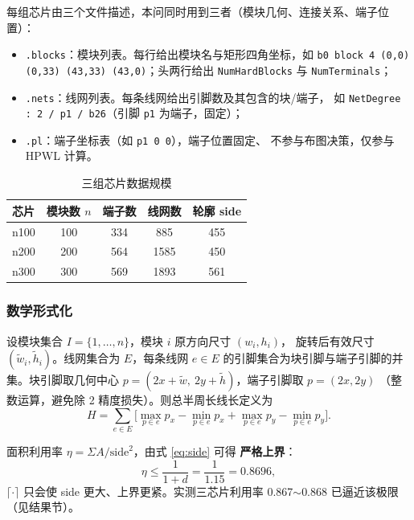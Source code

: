 \documentclass[12pt,a4paper]{article}
\begin{document}
每组芯片由三个文件描述，本问同时用到三者（模块几何、连接关系、端子位置）：

\begin{itemize}
    \item \texttt{.blocks}：模块列表。每行给出模块名与矩形四角坐标，如
    \texttt{b0 block 4 (0,0) (0,33) (43,33) (43,0)}；头两行给出
    \texttt{NumHardBlocks} 与 \texttt{NumTerminals}；
    \item \texttt{.nets}：线网列表。每条线网给出引脚数及其包含的块/端子，
    如 \texttt{NetDegree : 2 / p1 / b26}（引脚 \texttt{p1} 为端子，固定）；
    \item \texttt{.pl}：端子坐标表（如 \texttt{p1 0 0}），端子位置固定、
    不参与布图决策，仅参与 HPWL 计算。
\end{itemize}

\begin{table}[H]
\centering
\caption{三组芯片数据规模}
\begin{tabular}{lcccc}
\toprule
芯片 & 模块数 $n$ & 端子数 & 线网数 & 轮廓 side \\
\midrule
n100 & 100 & 334 & 885 & 455 \\
n200 & 200 & 564 & 1585 & 450 \\
n300 & 300 & 569 & 1893 & 561 \\
\bottomrule
\end{tabular}
\end{table}

\subsubsection*{数学形式化}

设模块集合 $I = \{1, \dots, n\}$，模块 $i$ 原方向尺寸 $(w_i, h_i)$，
旋转后有效尺寸 $(\tilde w_i, \tilde h_i)$。线网集合为 $E$，每条线网
$e \in E$ 的引脚集合为块引脚与端子引脚的并集。块引脚取几何中心
$p = (2x + \tilde w,\ 2y + \tilde h)$，端子引脚取 $p = (2x, 2y)$
（整数运算，避免除 2 精度损失）。则总半周长线长定义为
\begin{equation}
H = \sum_{e \in E} \Big[
\max_{p \in e} p_x - \min_{p \in e} p_x
+ \max_{p \in e} p_y - \min_{p \in e} p_y \Big].
\end{equation}

面积利用率 $\eta = \Sigma A / \text{side}^2$，由式 \eqref{eq:side} 可得
\textbf{严格上界}：
\begin{equation}
\eta \le \frac{1}{1+d} = \frac{1}{1.15} = 0.8696,
\end{equation}
$\lceil \cdot \rceil$ 只会使 side 更大、上界更紧。实测三芯片利用率
0.867$\sim$0.868 已逼近该极限（见结果节）。
\end{document}

